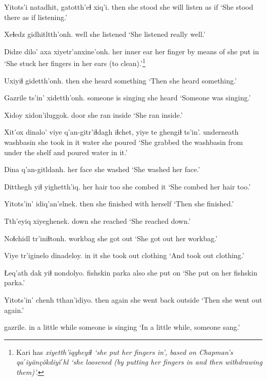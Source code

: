 \documentclass[12pt]{article}
\begin{document}
\gll Yitots'i natadhit, gatotth'eɬ xiq'i.
then {she stood} {she will listen} {as if}
\glt `She stood there as if listening.'
\glend

\gll Xeɬedz gidhitltth'onh.
well {she listened}
\glt `She listened really well.'
\glend

\gll Didze dilo' axa xiyetr'anxine'onh. 
{her inner ear} {her finger} {by means of} {she put in}
\glt `She stuck her fingers in her ears (to clean).'\footnote{Kari has \em xiyetth'iqgheyiɬ \em `she put her fingers in', based on Chapman's \em qaˊiy\"an\c{c}\u{o}kdiy\u{i}ˊhl \em `she loosened (by putting her fingers in and then withdrawing them)'.}
\glend

\gll Uxiyiɬ gidetth'onh.
then {she heard something}
\glt `Then she heard something.'
\glend

\gll Gazrile ts'in' xidetth'onh.
{someone is singing} {} {she heard}
\glt `Someone was singing.'
\glend

\gll Xidoy xidon'iluggok.
door {she ran inside}
\glt `She ran inside.'
\glend

\gll Xit'ox {dinalo' viye q'an-gitr'iɬdagh} iɬchet, yiye te ghengiɬ ts'in'.
underneath washbasin {she took} {in it} water {she poured}
\glt `She grabbed the washbasin from under the shelf and poured water in it.'
\glend

\gll Dina q'an-gitldanh.
{her face} {she washed}
\glt `She washed her face.'
\glend

\gll Ditthegh yiɬ yighetth'iq.
{her hair} too {she combed it}
\glt `She combed her hair too.'
\glend

\gll Yitots'in' idiq'an'elnek.
then {she finished with herself}
\glt `Then she finished.'
\glend

\gll Tth'eyiq xiyeghenek.
down {she reached}
\glt `She reached down.'
\glend

\gll Noɬchidl tr'iniɬtonh.
workbag {she got out}
\glt `She got out her workbag.'
\glend

\gll Viye tr'iginelo dinadeloy.
{in it} {she took out} clothing
\glt `And took out clothing.'
\glend

\gll Łeq'ath dak yiɬ nondolyo.
fishskin parka also {she put on}
\glt `She put on her fishskin parka.'
\glend

\gll Yitots'in' chenh tthan'idiyo.
then again {she went back outside}
\glt `Then she went out again.'
\glend

 gazrile.
{in a little while} {someone is singing}
\glt `In a little while, someone sang.'
\glend
\end{document}
